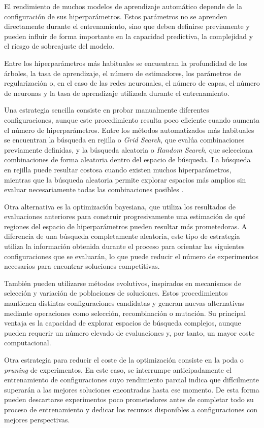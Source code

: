 \documentclass[IB]{TFUOC}%
\begin{document}
El rendimiento de muchos modelos de aprendizaje automático depende de la configuración de sus hiperparámetros. Estos parámetros no se aprenden directamente durante el entrenamiento, sino que deben definirse previamente y pueden influir de forma importante en la capacidad predictiva, la complejidad y el riesgo de sobreajuste del modelo.

Entre los hiperparámetros más habituales se encuentran la profundidad de los árboles, la tasa de aprendizaje, el número de estimadores, los parámetros de regularización o, en el caso de las redes neuronales, el número de capas, el número de neuronas y la tasa de aprendizaje utilizada durante el entrenamiento.

Una estrategia sencilla consiste en probar manualmente diferentes configuraciones, aunque este procedimiento resulta poco eficiente cuando aumenta el número de hiperparámetros. Entre los métodos automatizados más habituales se encuentran la búsqueda en rejilla o \textit{Grid Search}, que evalúa combinaciones previamente definidas, y la búsqueda aleatoria o \textit{Random Search}, que selecciona combinaciones de forma aleatoria dentro del espacio de búsqueda. La búsqueda en rejilla puede resultar costosa cuando existen muchos hiperparámetros, mientras que la búsqueda aleatoria permite explorar espacios más amplios sin evaluar necesariamente todas las combinaciones posibles \cite{bergstra2012random}.

Otra alternativa es la optimización bayesiana, que utiliza los resultados de evaluaciones anteriores para construir progresivamente una estimación de qué regiones del espacio de hiperparámetros pueden resultar más prometedoras. A diferencia de una búsqueda completamente aleatoria, este tipo de estrategia utiliza la información obtenida durante el proceso para orientar las siguientes configuraciones que se evaluarán, lo que puede reducir el número de experimentos necesarios para encontrar soluciones competitivas.

También pueden utilizarse métodos evolutivos, inspirados en mecanismos de selección y variación de poblaciones de soluciones. Estos procedimientos mantienen distintas configuraciones candidatas y generan nuevas alternativas mediante operaciones como selección, recombinación o mutación. Su principal ventaja es la capacidad de explorar espacios de búsqueda complejos, aunque pueden requerir un número elevado de evaluaciones y, por tanto, un mayor coste computacional.

Otra estrategia para reducir el coste de la optimización consiste en la poda o \textit{pruning} de experimentos. En este caso, se interrumpe anticipadamente el entrenamiento de configuraciones cuyo rendimiento parcial indica que difícilmente superarán a las mejores soluciones encontradas hasta ese momento. De esta forma pueden descartarse experimentos poco prometedores antes de completar todo su proceso de entrenamiento y dedicar los recursos disponibles a configuraciones con mejores perspectivas.
\end{document}
